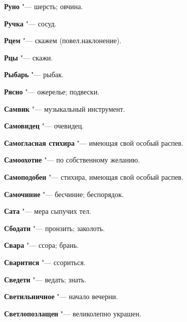 \begin{mymulticols}{2}
\noindent\textbf{Руно} "--- шерсть; овчина. 




\noindent\textbf{Ручка} "--- сосуд. 




\noindent\textbf{Рцем} "--- скажем (повел.наклонение). 




\noindent\textbf{Рцы} "--- скажи. 




\noindent\textbf{Рыбарь} "--- рыбак. 




\noindent\textbf{Рясно} "--- ожерелье; подвески. 









\noindent\textbf{Самвик} "--- музыкальный инструмент. 




\noindent\textbf{Самовидец} "--- очевидец. 




\noindent\textbf{Самогласная стихира} "--- имеющая свой особый распев. 




\noindent\textbf{Самоохотие} "--- по собственному желанию. 




\noindent\textbf{Самоподобен} "--- стихира, имеющая свой особый распев. 




\noindent\textbf{Самочиние} "--- бесчиние; беспорядок. 




\noindent\textbf{Сата} "--- мера сыпучих тел. 




\noindent\textbf{Сбодати} "--- пронзить; заколоть. 




\noindent\textbf{Свара} "--- ссора; брань. 




\noindent\textbf{Сваритися} "--- ссориться. 




\noindent\textbf{Сведети} "--- ведать; знать. 




\noindent\textbf{Светильничное} "--- начало вечерни. 




\noindent\textbf{Светлопозлащен} "--- великолепно украшен. 





\end{mymulticols}
